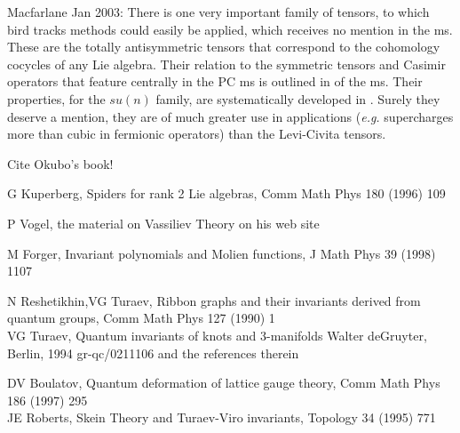  Macfarlane Jan 2003:
There is one very important family of tensors, to which
bird tracks methods could easily be applied, which receives no mention in the
ms. These are the totally antisymmetric tensors that correspond to the
cohomology cocycles of any Lie algebra. Their relation to the symmetric tensors
and Casimir operators that feature centrally in the PC ms is outlined
in  of the ms.
Their properties, for the $su(n)$ family,
are systematically developed in .
Surely they deserve a mention, they are of much greater use in
applications
({\em e.g.} supercharges more than cubic in fermionic operators)
than the Levi-Civita tensors.

 Cite Okubo's book!

G Kuperberg, Spiders for rank 2 Lie algebras, Comm Math Phys 180 (1996) 109

P Vogel, the material on Vassiliev Theory on his web site




M Forger, Invariant polynomials and Molien functions, J Math Phys 39 (1998) 1107

  N Reshetikhin,VG Turaev, Ribbon graphs and their invariants derived from
    quantum groups, Comm Math Phys 127 (1990) 1
\\
  VG Turaev, Quantum invariants of knots and 3-manifolds
    Walter deGruyter, Berlin, 1994
%
  gr-qc/0211106 and the references therein

%
  DV Boulatov, Quantum deformation of lattice gauge theory,
    Comm Math Phys 186 (1997) 295
\\
  JE Roberts, Skein Theory and Turaev-Viro invariants,
    Topology 34 (1995) 771


%
%
